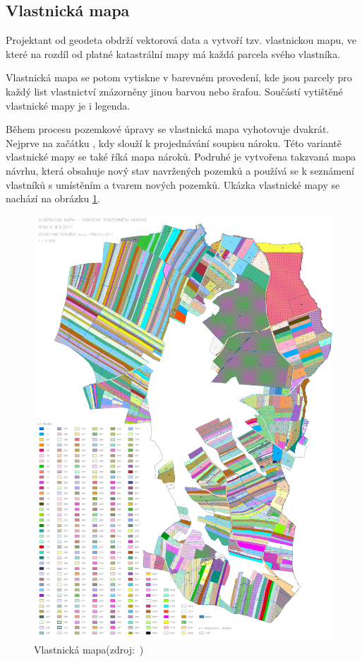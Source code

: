 \subsection{Vlastnická mapa}
\label{vlastnicka_mapa}

Projektant od geodeta obdrží vektorová data a vytvoří tzv. vlastnickou mapu, ve které na rozdíl od platné katastrální mapy má každá parcela svého vlastníka.

Vlastnická mapa se potom vytiskne v barevném provedení, kde jsou parcely pro každý list vlastnictví znázorněny jinou barvou nebo šrafou. Součástí vytištěné vlastnické mapy je i legenda.

Během procesu pozemkové úpravy se vlastnická mapa vyhotovuje dvakrát. Nejprve na začátku , kdy slouží k projednávání soupisu nároku. Této variantě vlastnické mapy se také říká mapa nároků. Podruhé je vytvořena takzvaná mapa návrhu, která obsahuje nový stav navržených pozemků a používá se k seznámení vlastníků s umístěním a tvarem nových pozemků. Ukázka vlastnické mapy se nachází na obrázku \ref{fig:vlastnicka_mapa}.

	\begin{figure}[H]
		\centering
		\includegraphics[width=.8\textwidth]{./pictures/vlastnicka_mapa.pdf}
		\caption[Vlastnická mapa]{Vlastnická mapa(zdroj:~\citep{skvorec})}
		\label{fig:vlastnicka_mapa}
 	\end{figure}


